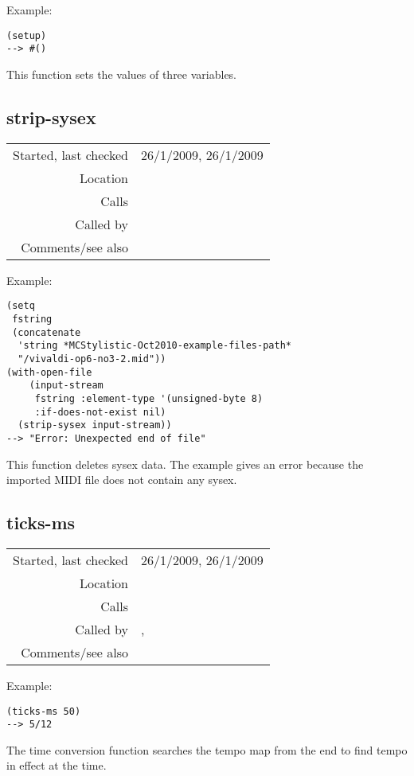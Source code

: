 \vspace{0.5cm}
\noindent Example:
\begin{verbatim}
(setup)
--> #()
\end{verbatim}

\noindent This function sets the values of three
variables.


\subsection*{strip-sysex}\label{fun:strip-sysex}

\vspace{0.3cm}
\begin{tabular}{r|p{8cm}}
Started, last checked & 26/1/2009, 26/1/2009 \\
Location & \nameref{sec:MIDI-import} \\
Calls & \\
Called by & \nameref{fun:parse-events} \\
Comments/see also &
\end{tabular}

\vspace{0.5cm}
\noindent Example:
\begin{verbatim}
(setq
 fstring
 (concatenate
  'string *MCStylistic-Oct2010-example-files-path*
  "/vivaldi-op6-no3-2.mid"))
(with-open-file
    (input-stream
     fstring :element-type '(unsigned-byte 8)
     :if-does-not-exist nil)
  (strip-sysex input-stream))
--> "Error: Unexpected end of file"
\end{verbatim}

\noindent This function deletes sysex data. The
example gives an error because the imported MIDI file
does not contain any sysex.


\subsection*{ticks-ms}\label{fun:ticks-ms}

\vspace{0.3cm}
\begin{tabular}{r|p{8cm}}
Started, last checked & 26/1/2009, 26/1/2009 \\
Location & \nameref{sec:MIDI-import} \\
Calls & \\
Called by & \nameref{fun:handle-note}, \nameref{fun:handle-off} \\
Comments/see also &
\end{tabular}

\vspace{0.5cm}
\noindent Example:
\begin{verbatim}
(ticks-ms 50)
--> 5/12
\end{verbatim}

\noindent The time conversion function searches the
tempo map from the end to find tempo in effect at the
time.











